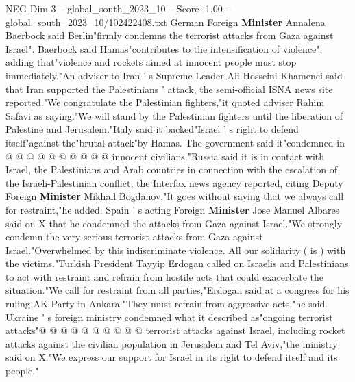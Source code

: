 \begin{textsample}{NEG Dim 3 – global\_south\_2023\_10 – Score -1.00 – global\_south\_2023\_10/102422408.txt}
German Foreign \textbf{Minister} Annalena Baerbock said Berlin"firmly condemns the terrorist attacks from Gaza against Israel".
Baerbock said Hamas"contributes to the intensification of violence", adding that"violence and rockets aimed at innocent people must stop immediately."An adviser to Iran ' s Supreme Leader Ali Hosseini Khamenei said that Iran supported the Palestinians ' attack, the semi-official ISNA news site reported."We congratulate the Palestinian fighters,"it quoted adviser Rahim Safavi as saying."We will stand by the Palestinian fighters until the liberation of Palestine and Jerusalem."Italy said it backed"Israel ' s right to defend itself"against the"brutal attack"by Hamas.
The government said it"condemned in @ @ @ @ @ @ @ @ @ @ innocent civilians."Russia said it is in contact with Israel, the Palestinians and Arab countries in connection with the escalation of the Israeli-Palestinian conflict, the Interfax news agency reported, citing Deputy Foreign \textbf{Minister} Mikhail Bogdanov."It goes without saying that we always call for restraint,"he added.
Spain ' s acting Foreign \textbf{Minister} Jose Manuel Albares said on X that he condemned the attacks from Gaza against Israel."We strongly condemn the very serious terrorist attacks from Gaza against Israel."Overwhelmed by this indiscriminate violence.
All our solidarity ( is ) with the victims."Turkish President Tayyip Erdogan called on Israelis and Palestinians to act with restraint and refrain from hostile acts that could exacerbate the situation."We call for restraint from all parties,"Erdogan said at a congress for his ruling AK Party in Ankara."They must refrain from aggressive acts,"he said.
Ukraine ' s foreign ministry condemned what it described as"ongoing terrorist attacks"@ @ @ @ @ @ @ @ @ @ terrorist attacks against Israel, including rocket attacks against the civilian population in Jerusalem and Tel Aviv,"the ministry said on X."We express our support for Israel in its right to defend itself and its people."

\end{textsample}
